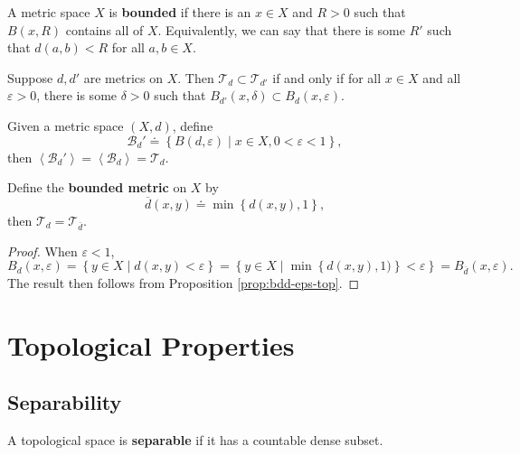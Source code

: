 \documentclass[twoside,10pt]{report}
\begin{document}
A metric space $X$ is \textbf{bounded} if there is an $x \in X$ and $R>0$ such that $B(x,R)$ contains all of $X$. Equivalently, we can say that there is some $R'$ such that $d(a,b) < R$ for all $a,b \in X$.

\begin{prop}
	Suppose $d,d'$ are metrics on $X$. Then $\mathcal{T}_{d}\subset \mathcal{T}_{d'}$ if and only if for all $x \in X$ and all $\varepsilon>0$, there is some $\delta>0$ such that $B_{d'}(x,\delta)\subset B_{d}(x,\varepsilon)$.
\end{prop}

\begin{prop}
	\label{prop:bdd-eps-top}
	Given a metric space $(X,d)$, define
	\[
		\mathcal{B}_{d}' \doteq \left\{ B(d,\varepsilon) \;|\; x \in X, 0 < \varepsilon < 1 \right\},
	\] then $\left\langle \mathcal{B}_{d}' \right\rangle = \left\langle \mathcal{B}_{d} \right\rangle = \mathcal{T}_{d}$.
\end{prop}

\begin{prop}
Define the \textbf{bounded metric} on $X$ by
\[
	\overline{d}(x,y) \doteq \min\left\{ d(x,y), 1 \right\},
\] then $\mathcal{T}_{d} = \mathcal{T}_{\overline{d}}$.
\end{prop}
\begin{proof}
	When $\varepsilon<1$,
	\[
		B_{d}(x,\varepsilon) = \left\{ y \in X \;|\; d(x,y)<\varepsilon \right\} = \left\{ y \in X \;|\; \min\left\{ d(x,y),1) \right\}<\varepsilon \right\} = B_{\overline{d}}(x,\varepsilon).
	\] The result then follows from Proposition \ref{prop:bdd-eps-top}.
\end{proof}


\chapter{Topological Properties}


\section{Separability}

\begin{defn}[]
A topological space is \textbf{separable} if it has a countable dense subset.
\end{defn}
\end{document}
